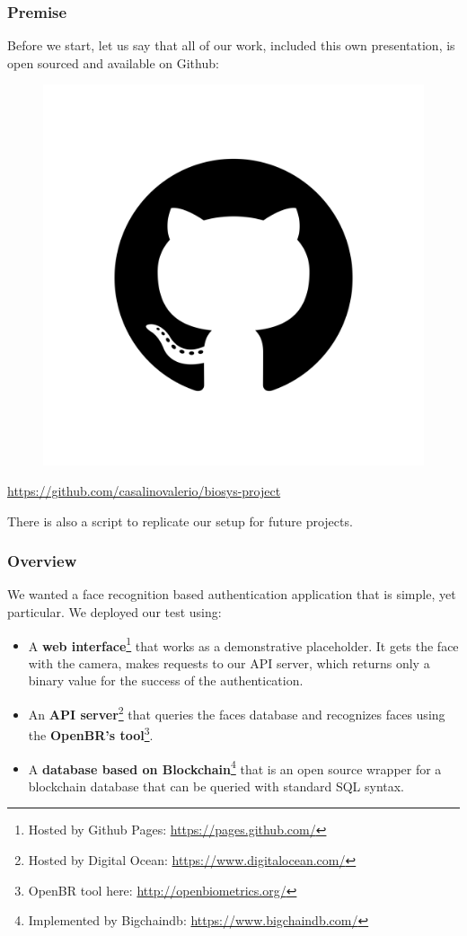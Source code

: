\begin{frame} \frametitle{Premise}

	Before we start, let us say that all of our work, included this own presentation,
	is open sourced and available 
	on Github:
	
	\begin{center}
		\begin{figure}[H]
			\includegraphics[width=.3\textwidth]{img/github}
		\end{figure}
		{\color{red} \url{https://github.com/casalinovalerio/biosys-project}}
	\end{center}
	\vfill
	There is also a script to replicate our setup for future projects.
	
\end{frame}

\begin{frame} \frametitle{Overview}
We wanted a face recognition based authentication application that is simple, 
yet particular. We deployed our test using:

\begin{itemize}

	\item A \textbf{web interface}\footnote{Hosted by Github Pages: 
	{\color{red}\url{https://pages.github.com/}}} that works as a 
	demonstrative placeholder. It gets the face with the camera, makes 
	requests to our API server, which returns only a binary value for the 
	success of the authentication.
	
	\item An \textbf{API server}\footnote{Hosted by Digital Ocean: 
	{\color{red} \url{https://www.digitalocean.com/}}} that queries the 
	faces database and recognizes faces using the \textbf{OpenBR's 
	tool}\footnote{OpenBR tool here: {\color{red} 
	\url{http://openbiometrics.org/}}}.
	
	\item A \textbf{database based on Blockchain}\footnote{Implemented by 
	Bigchaindb: {\color{red} \url{https://www.bigchaindb.com/}}} that is an
	open source wrapper for a blockchain database that can be queried with 
	standard SQL syntax.
	
\end{itemize}
\end{frame}

